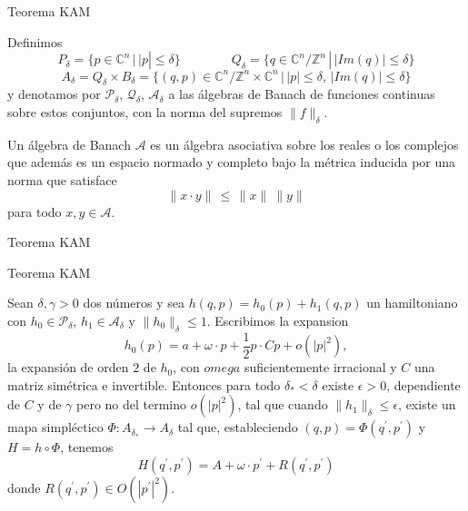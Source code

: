 \documentclass[8pt]{beamer}
\def\onehalf{{\textstyle\frac12}}
\def\onehalf{{\textstyle \frac12}}
\renewcommand{\>}{\rangle}
\newcommand{\<}{\langle}
\newcommand{\be}{\begin{equation}}
\newcommand{\ee}{\end{equation}}
\begin{document}
\begin{frame}{Teorema KAM}

Definimos 
\be 
	P_{\delta} = \lbrace p \in \mathbb{C}^{n} \, | \, |p| \leq \delta \rbrace
	\qquad 
	\qquad 
	Q_{\delta} = \lbrace q \in \mathbb{C}^{n}/\mathbb{Z}^{n} \, | \, |Im(q)| \leq \delta \rbrace \nonumber
\ee
\vspace{0.1cm}
\be 
	A_{\delta} 
	= Q_{\delta} \times B_{\delta} 
	= \lbrace (q,p) \in \mathbb{C}^{n}/\mathbb{Z}^{n} \times \mathbb{C}^{n} \, | \,  |p| \leq \delta, \, |Im(q)| \leq \delta \rbrace \nonumber
\ee
y denotamos por $\mathcal{P}_{\delta}$, $\mathcal{Q}_{\delta}$, $\mathcal{A}_{\delta}$ a las álgebras de Banach de funciones continuas sobre estos conjuntos, con la norma del supremos $\parallel f \parallel_{\delta}$.

\vspace{1cm}

Un álgebra de Banach $\mathcal{A}$ es un álgebra asociativa sobre los reales o los complejos que además es un espacio normado y completo bajo la métrica inducida por una norma que satisface 
\be 
	\parallel x \cdot y \parallel \, \leq \, \parallel x \parallel \ \parallel y \parallel
	\nonumber
\ee
para todo $x,y \in \mathcal{A}$.

\end{frame}

\begin{frame}{Teorema KAM}

\begin{mybox}{Teorema KAM}

Sean $\delta, \gamma > 0$ dos números y sea $h(q,p) = h_{0}(p) + h_{1}(q,p)$ un hamiltoniano con $h_{0} \in \mathcal{P}_{\delta}$, $h_{1} \in \mathcal{A}_{\delta}$ 
y $\parallel h_{0} \parallel_{\delta} \leq 1$. Escribimos la expansion
\be 
	h_{0}(p) = a + \omega \cdot p + \onehalf p \cdot C p + o(|p|^{2}),
	\nonumber 
\ee
la expansión de orden $2$ de $h_{0}$, con $omega$ suficientemente irracional y $C$ una matriz simétrica e invertible. Entonces para todo $\delta_{\ast} <  \delta$ existe $\epsilon > 0$, dependiente de $C$ y de $\gamma$ pero no del termino $o(|p|^{2})$, tal que
cuando $\parallel h_{1} \parallel_{\delta} \leq \epsilon$, existe un mapa simpléctico $\Phi: A_{\delta_{\ast}} \rightarrow A_{\delta}$ tal que, estableciendo $(q,p) = \Phi(q^{\prime},p^{\prime})$ y $H = h \circ \Phi$, tenemos
\be 
	H(q^{\prime},p^{\prime}) = A + \omega \cdot p^{\prime} + R(q^{\prime},p^{\prime})
	\nonumber
\ee 
donde $R(q^{\prime},p^{\prime}) \in O(|p^{\prime}|^{2})$.

\end{mybox}

\end{frame}
\end{document}
